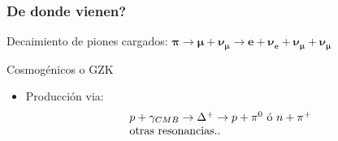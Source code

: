 \begin{frame}
 \frametitle{De donde vienen?}
 \begin{alertblock}{}
  \centering
  Decaimiento de piones cargados: $\bm{\pi\rightarrow\mu+\nu_\mu\rightarrow e + \nu_e + \nu_\mu + \nu_\mu}$
 \end{alertblock}
 \begin{block}{Cosmog\'enicos o GZK}
  \begin{itemize}
   \item Producci\'on via:
   \begin{displaymath}
    \begin{array}{l}
		p + \gamma_{CMB} \rightarrow \Delta^{+} \rightarrow p +\pi^{0}\,\,{\rm \acute{o}}\,\, n +\pi^{+} \\
        {\rm otras\,\, resonancias..}
	\end{array}
   \end{displaymath}
  \end{itemize}
 \end{block}
 \vfill
 \begin{center}
 \end{center}
 \vfill
\end{frame}

